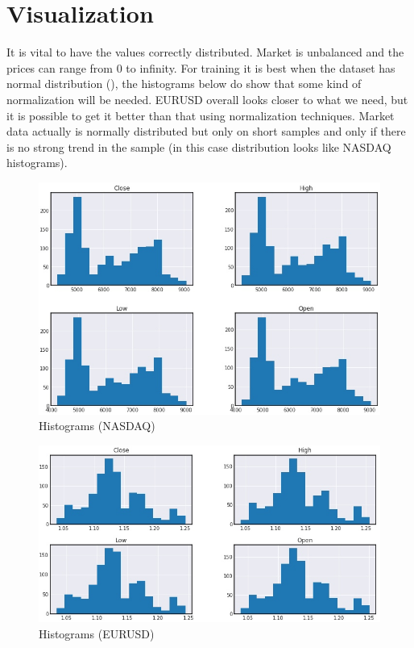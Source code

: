 \documentclass[a4paper,12pt]{article}
\begin{document}
\section{Visualization}
It is vital to have the values correctly distributed. Market is unbalanced and the prices can range from 0 to infinity. For training it is best when the dataset has normal distribution (\cite{Distribution}), the histograms below do show that some kind of normalization will be needed.
EURUSD overall looks closer to what we need, but it is possible to get it better than that using normalization techniques.
Market data actually is normally distributed but only on short samples and only if there is no strong trend in the sample (in this case distribution looks like NASDAQ histograms).
\begin{figure}[h]
	\includegraphics[width=\textwidth]{nasdaqHist}
	\caption{Histograms (NASDAQ)}
	\centering
\end{figure}
\begin{figure}[h]
	\includegraphics[width=\textwidth]{eurusdHist}
	\caption{Histograms (EURUSD)}
	\centering
\end{figure}
\end{document}
